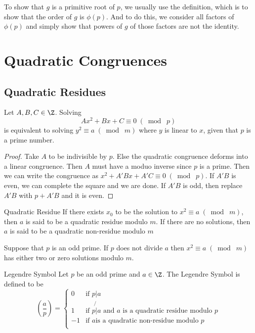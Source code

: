 \documentclass[a4paper]{article}
\begin{document}
To show that $g$ is a primitive root of $p$, we usually use the definition, which is to show that the order of $g$ is $\phi(p)$. And to do this, we consider all factors of $\phi(p)$ and simply show that powers of $g$ of those factors are not the identity. 

\pagebreak
\section{Quadratic Congruences}
\subsection{Quadratic Residues}
\begin{prp}{}{} Let $A,B,C\in\Z$. Solving $$Ax^2+Bx+C\equiv0\;(\bmod\; p)$$ is equivalent to solving $y^2\equiv a\;(\bmod\; m)$ where $y$ is linear to $x$, given that $p$ is a prime number. \tcbline
\begin{proof}
Take $A$ to be indivisible by $p$. Else the quadratic congruence deforms into a linear congruence. Then $A$ must have a moduo inverse since $p$ is a prime. Then we can write the congruence as $x^2+A'Bx+A'C\equiv 0\;(\bmod\; p)$. If $A'B$ is even, we can complete the square and we are done. If $A'B$ is odd, then replace $A'B$ with $p+A'B$ and it is even. 
\end{proof}
\end{prp}

\begin{defn}{Quadratic Residue}{} If there exists $x_0$ to be the solution to $x^2\equiv a\;(\bmod\; m)$, then $a$ is said to be a quadratic residue modulo $m$. If there are no solutions, then $a$ is said to be a quadratic non-residue modulo $m$
\end{defn}

\begin{prp}{}{} Suppose that $p$ is an odd prime. If $p$ does not divide $a$ then $x^2\equiv a\;(\bmod\; m)$ has either two or zero solutions modulo $m$. 
\end{prp}

\begin{defn}{Legendre Symbol}{} Let $p$ be an odd prime and $a\in\Z$. The Legendre Symbol is defined to be $$\left(\frac{a}{p}\right)=\begin{cases}
0 & \text{if }p|a\\
1 & \text{if }p\not{|}a \text{ and $a$ is a quadratic residue modulo }p\\
-1 & \text{if }a \text{is a quadratic non-residue modulo }p\\
\end{cases}$$
\end{defn}
\end{document}
